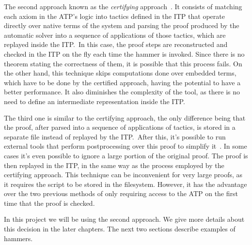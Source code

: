 The second approach known as the \textit{certifying} approach~\cite{snipe}. It consists of matching
each axiom in the ATP's logic into tactics
defined in the ITP that operate directly over native terms of the system and parsing
the proof produced by the automatic solver into a sequence of applications
of those tactics, which are replayed inside the ITP.\
In this case, the proof steps are reconstructed and checked in the ITP on the
fly each time the hammer is invoked. Since there is no theorem stating the
correctness of them, it is possible that this process fails.
On the other hand,
this technique skips computations done over embedded terms, which have to be done by the
certified approach, having the potential to have a better
performance. It also diminishes the complexity of the tool, as there is no need to
define an intermediate representation inside the ITP.\

The third one is similar to the certifying approach, the only difference being that
the proof, after parsed into a sequence of applications of tactics, is stored in a separate
file instead of replayed by the ITP.\ After this, it's possible to run external tools
that perform postprocessing over this proof to simplify it~\cite{hammer_20, hammer_21}.
In some cases it's even possible to ignore a large
portion of the original proof. The proof is then replayed in the ITP, in the same way as the process
employed by the certifying approach. This technique can be inconvenient for very large proofs,
as it requires the script to be stored in the filesystem. However,
it has the advantage over the two previous methods of only requiring access to the ATP
on the first time that the proof is checked.

In this project we will be using the second approach. We give more details about this
decision in the later chapters. The next two sections describe examples of hammers.
